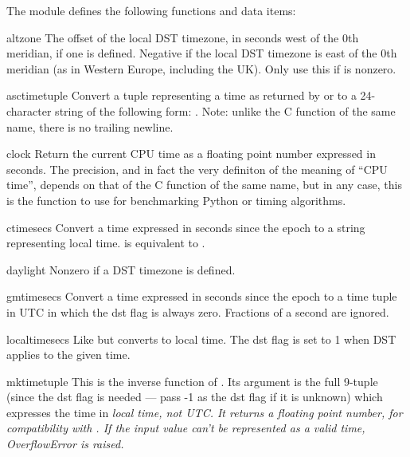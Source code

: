 The module defines the following functions and data items:

\renewcommand{\indexsubitem}{(in module time)}

\begin{datadesc}{altzone}
The offset of the local DST timezone, in seconds west of the 0th
meridian, if one is defined.  Negative if the local DST timezone is
east of the 0th meridian (as in Western Europe, including the UK).
Only use this if  is nonzero.
\end{datadesc}

\begin{funcdesc}{asctime}{tuple}
Convert a tuple representing a time as returned by  or
 to a 24-character string of the following form:
.  Note: unlike the C function of
the same name, there is no trailing newline.
\end{funcdesc}

\begin{funcdesc}{clock}{}
Return the current CPU time as a floating point number expressed in
seconds.  The precision, and in fact the very definiton of the meaning
of ``CPU time'', depends on that of the C function of the same name,
but in any case, this is the function to use for benchmarking Python
or timing algorithms.
\end{funcdesc}

\begin{funcdesc}{ctime}{secs}
Convert a time expressed in seconds since the epoch to a string
representing local time.   is equivalent to
.
\end{funcdesc}

\begin{datadesc}{daylight}
Nonzero if a DST timezone is defined.
\end{datadesc}

\begin{funcdesc}{gmtime}{secs}
Convert a time expressed in seconds since the epoch to a time tuple
in UTC in which the dst flag is always zero.  Fractions of a second are
ignored.
\end{funcdesc}

\begin{funcdesc}{localtime}{secs}
Like  but converts to local time.  The dst flag is set
to 1 when DST applies to the given time.
\end{funcdesc}

\begin{funcdesc}{mktime}{tuple}
This is the inverse function of .  Its argument is the
full 9-tuple (since the dst flag is needed --- pass -1 as the dst flag if
it is unknown) which expresses the time
in \em{local} time, not UTC.  It returns a floating
point number, for compatibility with .  If the input
value can't be represented as a valid time, OverflowError is raised.
\end{funcdesc}


